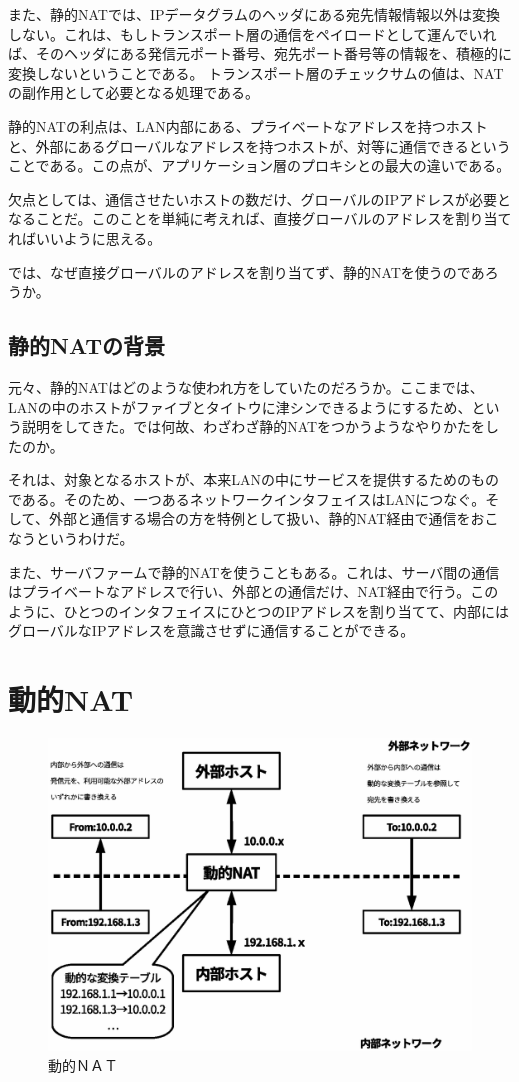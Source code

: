 また、静的NATでは、IPデータグラムのヘッダにある宛先情報情報以外は変換しない。これは、もしトランスポート層の通信をペイロードとして運んでいれば、そのヘッダにある発信元ポート番号、宛先ポート番号等の情報を、積極的に変換しないということである。
トランスポート層のチェックサムの値は、NATの副作用として必要となる処理である。

静的NATの利点は、LAN内部にある、プライベートなアドレスを持つホストと、外部にあるグローバルなアドレスを持つホストが、対等に通信できるということである。この点が、アプリケーション層のプロキシとの最大の違いである。

欠点としては、通信させたいホストの数だけ、グローバルのIPアドレスが必要となることだ。このことを単純に考えれば、直接グローバルのアドレスを割り当てればいいように思える。

では、なぜ直接グローバルのアドレスを割り当てず、静的NATを使うのであろうか。

\subsection{静的NATの背景}
元々、静的NATはどのような使われ方をしていたのだろうか。ここまでは、LANの中のホストがファイブとタイトウに津シンできるようにするため、という説明をしてきた。では何故、わざわざ静的NATをつかうようなやりかたをしたのか。

それは、対象となるホストが、本来LANの中にサービスを提供するためのものである。そのため、一つあるネットワークインタフェイスはLANにつなぐ。そして、外部と通信する場合の方を特例として扱い、静的NAT経由で通信をおこなうというわけだ。

また、サーバファームで静的NATを使うこともある。これは、サーバ間の通信はプライベートなアドレスで行い、外部との通信だけ、NAT経由で行う。このように、ひとつのインタフェイスにひとつのIPアドレスを割り当てて、内部にはグローバルなIPアドレスを意識させずに通信することができる。

\section{動的NAT}

\begin{figure}[htbp]
	\includegraphics[width=12cm,clip]{draw/fig8.eps}
	\caption{動的ＮＡＴ}
	\label{fig:dynamic-nat}
\end{figure}

